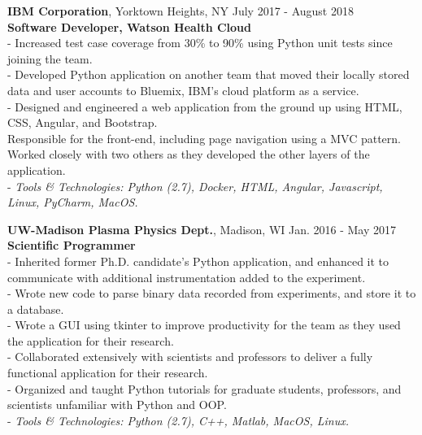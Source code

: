 \documentclass{resume}
\begin{document}
\begin{flushleft}
\textbf{IBM Corporation}, Yorktown Heights, NY \hfill July 2017 - August 2018\\
\textbf{Software Developer, Watson Health Cloud}\\
{\footnotesize
	\ttab- Increased test case coverage from 30\% to 90\% using Python unit tests since joining the team. \\
	\ttab- Developed Python application on another team that moved their locally stored data and user accounts to Bluemix,
	\ttab IBM's cloud platform as a service. \\
	\ttab- Designed and engineered a web application from the ground up using HTML, CSS, Angular, and Bootstrap. \\
	\ttab Responsible for the front-end, including page navigation using a MVC pattern.  Worked closely with two others as they
	\ttab developed the other layers of the application. \\
	\ttab- \textit{Tools \& Technologies: Python (2.7), Docker, HTML, Angular, Javascript, Linux, PyCharm, MacOS.}\\[3mm]
}

\textbf{UW-Madison Plasma Physics Dept.}, Madison, WI \hfill Jan. 2016 - May 2017 \\
\textbf{Scientific Programmer}\\
{\footnotesize
	\ttab- Inherited former Ph.D. candidate's Python application, and enhanced it to communicate with additional instrumentation
	\ttab added to the experiment. \\
	\ttab- Wrote new code to parse binary data recorded from experiments, and store it to a database. \\
	\ttab- Wrote a GUI using tkinter to improve productivity for the team as they used the application for their research. \\
	\ttab- Collaborated extensively with scientists and professors to deliver a fully functional application for their research. \\
	\ttab- Organized and taught Python tutorials for graduate students, professors, and scientists unfamiliar with Python and OOP. \\
	\ttab- \textit{Tools \& Technologies: Python (2.7), C++,  Matlab, MacOS, Linux.}\\[5mm]
}


\end{flushleft}
\end{document}
